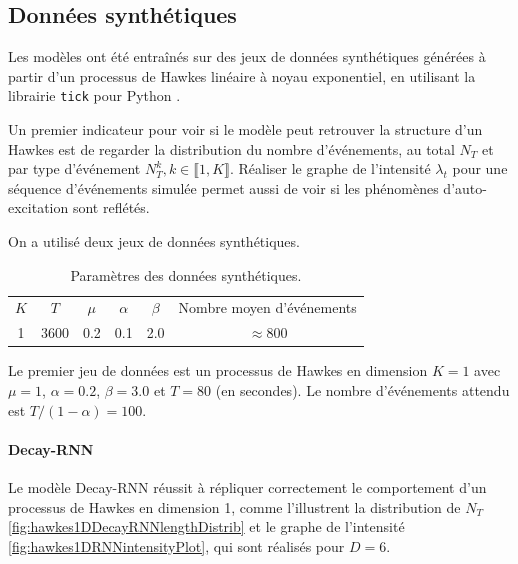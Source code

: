 \documentclass[../main.tex]{subfiles}
\begin{document}
\subsection{Données synthétiques}\label{ssec:synthResults}

Les modèles ont été entraînés sur des jeux de données synthétiques générées à partir d'un processus de Hawkes linéaire à noyau exponentiel, en utilisant la librairie \verb|tick| pour Python \cite{2017arXiv170703003B}.

Un premier indicateur pour voir si le modèle peut retrouver la structure d'un Hawkes est de regarder la distribution du nombre d'événements, au total $N_T$ et par type d'événement $N^k_T, k\in\llbracket 1,K\rrbracket$. Réaliser le graphe de l'intensité $\lambda_t$ pour une séquence d'événements simulée permet aussi de voir si les phénomènes d'auto-excitation sont reflétés.

On a utilisé deux jeux de données synthétiques.

\begin{table}[h]
	\begin{tabular}[]{c|c|c|c|c|c}
		$K$ & $T$ & $\mu$ & $\alpha$ & $\beta$ & Nombre moyen d'événements \\
		1 & 3600 & 0.2 & 0.1 & 2.0 & $\approx 800$
	\end{tabular}
	\caption{Paramètres des données synthétiques.}\label{tab:synthHawkesData}
\end{table}

Le premier jeu de données est un processus de Hawkes en dimension $K=1$ avec $\mu=1$, $\alpha = \num{0.2}$, $\beta = \num{3.0}$ et $T = \num{80}$ (en secondes). Le nombre d'événements attendu est $T/(1-\alpha) = \num{100}$.

\paragraph{Decay-RNN}
Le modèle Decay-RNN réussit à répliquer correctement le comportement d'un processus de Hawkes en dimension 1, comme l'illustrent la distribution de $N_T$ \cref{fig:hawkes1DDecayRNNlengthDistrib} et le graphe de l'intensité \cref{fig:hawkes1DRNNintensityPlot}, qui sont réalisés pour $D=6$.\footnotemark

\end{document}

